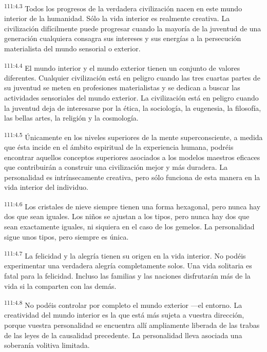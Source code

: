 \par
\textsuperscript{111:4.3} Todos los progresos de la verdadera civilización nacen en este mundo interior de la humanidad. Sólo la vida interior es realmente creativa. La civilización difícilmente puede progresar cuando la mayoría de la juventud de una generación cualquiera consagra sus intereses y sus energías a la persecución materialista del mundo sensorial o exterior.

\par
\textsuperscript{111:4.4} El mundo interior y el mundo exterior tienen un conjunto de valores diferentes. Cualquier civilización está en peligro cuando las tres cuartas partes de su juventud se meten en profesiones materialistas y se dedican a buscar las actividades sensoriales del mundo exterior. La civilización está en peligro cuando la juventud deja de interesarse por la ética, la sociología, la eugenesia, la filosofía, las bellas artes, la religión y la cosmología.

\par
\textsuperscript{111:4.5} Únicamente en los niveles superiores de la mente superconsciente, a medida que ésta incide en el ámbito espiritual de la experiencia humana, podréis encontrar aquellos conceptos superiores asociados a los modelos maestros eficaces que contribuirán a construir una civilización mejor y más duradera. La personalidad es intrínsecamente creativa, pero sólo funciona de esta manera en la vida interior del individuo.

\par
\textsuperscript{111:4.6} Los cristales de nieve siempre tienen una forma hexagonal, pero nunca hay dos que sean iguales. Los niños se ajustan a los tipos, pero nunca hay dos que sean exactamente iguales, ni siquiera en el caso de los gemelos. La personalidad sigue unos tipos, pero siempre es única.

\par
\textsuperscript{111:4.7} La felicidad y la alegría tienen su origen en la vida interior. No podéis experimentar una verdadera alegría completamente solos. Una vida solitaria es fatal para la felicidad. Incluso las familias y las naciones disfrutarán más de la vida si la comparten con las demás.

\par
\textsuperscript{111:4.8} No podéis controlar por completo el mundo exterior ---el entorno. La creatividad del mundo interior es la que está más sujeta a vuestra dirección, porque vuestra personalidad se encuentra allí ampliamente liberada de las trabas de las leyes de la causalidad precedente. La personalidad lleva asociada una soberanía volitiva limitada.

